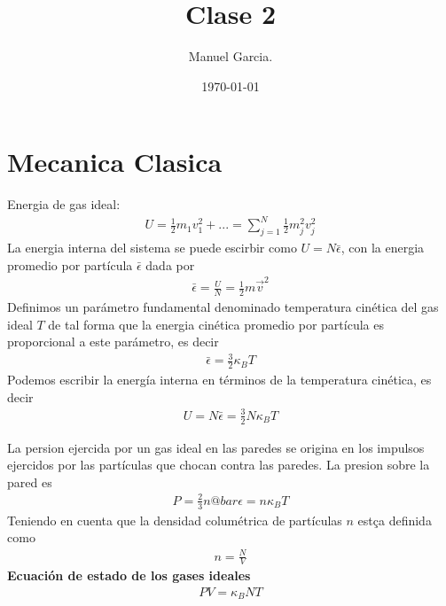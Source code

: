 \documentclass{article}
\title{Clase 2 }
\author{Manuel Garcia.}
\date{\today}
\begin{document}
\maketitle

\section{Mecanica Clasica}
Energia de gas ideal: 
\begin{gather*}
  U = \frac{1}{2}m_1v_1 ^2 + ... = \displaystyle\sum_{j=1 }^{N } \frac{1 }{2} m_j ^2 v_j ^2 
\end{gather*}
La energia interna del sistema se puede escirbir como $ U = N \bar \epsilon $, con la energia promedio por partícula $ \bar \epsilon  $ dada por 
\begin{gather*}
  \bar \epsilon = \frac{U }{N } = \frac{1}{2}m \vec v^2 
\end{gather*}
Definimos un parámetro fundamental denominado temperatura cinética del gas ideal $ T  $ de tal forma que la energia cinética promedio por partícula es proporcional a este parámetro, es decir 
\begin{gather*}
  \bar \epsilon = \frac{3 }{2} \kappa_B T  
\end{gather*}
Podemos escribir la energía interna en términos de la temperatura cinética, es decir 
\begin{gather*}
  U = N \bar \epsilon = \frac{3}{2} N \kappa_B T 
\end{gather*}

\hfill 

\hfill

La persion ejercida por un gas ideal en las paredes se origina en los impulsos ejercidos por las partículas que chocan contra las paredes. La presion sobre la pared es 
\begin{gather*}
  P = \frac{2}{3 } n @bar \epsilon  =  n \kappa_B T 
\end{gather*}
Teniendo en cuenta que la densidad columétrica de partículas $ n  $ estça definida como 
\begin{gather*}
  n = \frac{N }{V }  
\end{gather*}
\textbf{Ecuación de estado de los gases ideales }
\begin{gather*}
  PV = \kappa_B NT 
\end{gather*}
\end{document}
